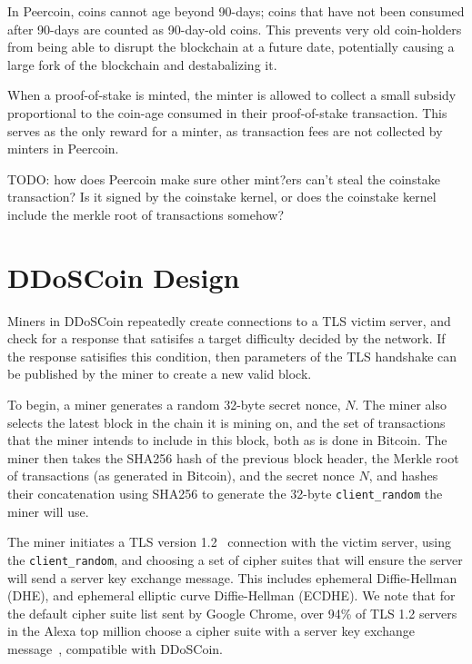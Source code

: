 In Peercoin, coins cannot age beyond 90-days; coins that have not been consumed
after 90-days are counted as 90-day-old coins. This prevents very old
coin-holders from being able to disrupt the blockchain at a future date,
potentially causing a large fork of the blockchain and destabalizing it.

When a proof-of-stake is minted, the minter is allowed to collect a small
subsidy proportional to the coin-age consumed in their proof-of-stake
transaction. This serves as the only reward for a minter, as transaction fees are not
collected by minters in Peercoin.

TODO: how does Peercoin make sure other mint?ers can't steal the coinstake
transaction? Is it signed by the coinstake kernel, or does the coinstake kernel
include the merkle root of transactions somehow?

\section{DDoSCoin Design}

\FigOverview

Miners in DDoSCoin repeatedly create connections to a TLS victim server, and
check for a response that satisifes a target difficulty decided by the network.
If the response satisifies this condition, then parameters of the TLS handshake
can be published by the miner to create a new valid block.

To begin, a miner generates a random 32-byte secret nonce, $N$. The miner also
selects the latest block in the chain it is mining on, and the set of
transactions that the miner intends to include in this block, both as is done in
Bitcoin. The miner then takes the SHA256 hash of the previous block header, the
Merkle root of transactions (as generated in Bitcoin), and the secret nonce $N$,
and hashes their concatenation using SHA256 to generate the
32-byte \texttt{client\_random} the miner will use.

The miner initiates a TLS version 1.2~\cite{rfc5246} connection with the victim
server, using the \texttt{client\_random}, and choosing a set of cipher suites
that will ensure the server will send a server key exchange message. This
includes ephemeral Diffie-Hellman (DHE), and ephemeral elliptic curve
Diffie-Hellman (ECDHE). We note that for the default cipher suite list sent by
Google Chrome, over 94\% of TLS 1.2 servers in the Alexa top million choose a
cipher suite with a server key exchange message~\cite{censys}, compatible with
DDoSCoin.


